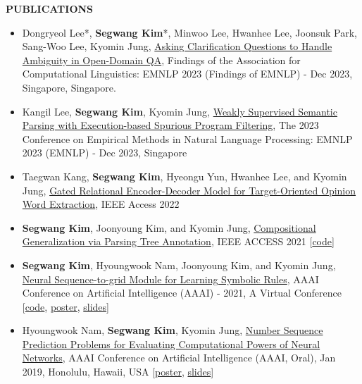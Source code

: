 \documentclass[12pt]{article}
\begin{document}
\vspace{0.2in} %


\begin{center}
	{\noindent \bfseries PUBLICATIONS}
    \noindent\makebox[\linewidth]{\rule{0.75\paperwidth}{0.4pt}}
\end{center}

\vspace{8pt} %
\begin{itemize}
\item Dongryeol Lee*, \textbf{Segwang Kim}*, Minwoo Lee, Hwanhee Lee, Joonsuk Park, Sang-Woo Lee, Kyomin Jung, \href{-}{Asking Clarification Questions to Handle Ambiguity in Open-Domain QA}, Findings of the Association for Computational Linguistics: EMNLP 2023 (Findings of EMNLP) - Dec 2023, Singapore, Singapore.
\item Kangil Lee, \textbf{Segwang Kim}, Kyomin Jung, \href{-}{Weakly Supervised Semantic Parsing with Execution-based Spurious Program Filtering}, The 2023 Conference on Empirical Methods in Natural Language Processing: EMNLP 2023 (EMNLP) - Dec 2023, Singapore
\item Taegwan Kang, \textbf{Segwang Kim}, Hyeongu Yun, Hwanhee Lee, and Kyomin Jung, \href{https://ieeexplore.ieee.org/document/9982601}{Gated Relational Encoder-Decoder Model for Target-Oriented Opinion Word Extraction}, IEEE Access 2022
\item \textbf{Segwang Kim}, Joonyoung Kim, and Kyomin Jung, \href{https://ieeexplore.ieee.org/document/9340248}{Compositional Generalization via Parsing Tree Annotation}, IEEE ACCESS 2021 [\href{https://github.com/SegwangKim/annotation-of-targets-using-parsing-trees}{code}]
\item \textbf{Segwang Kim}, Hyoungwook Nam, Joonyoung Kim, and Kyomin Jung, 
\href{https://ojs.aaai.org/index.php/AAAI/article/view/16994}{Neural Sequence-to-grid Module for Learning Symbolic Rules}, AAAI Conference on Artificial Intelligence (AAAI) - 2021, A Virtual Conference
[\href{https://github.com/SegwangKim/neural-seq2grid-module}{code}, \href{https://segwangkim.github.io/pdfs/poster_AAAI21.pdf}{poster}, \href{https://www.slideshare.net/segwangkim/seq2grid-aaai-2021}{slides}]
\item Hyoungwook Nam, \textbf{Segwang Kim}, Kyomin Jung, \href{https://ojs.aaai.org//index.php/AAAI/article/view/4387}{Number Sequence Prediction Problems for Evaluating Computational Powers of Neural Networks}, AAAI Conference on Artificial Intelligence (AAAI, Oral), Jan 2019, Honolulu, Hawaii, USA
[\href{https://segwangkim.github.io/pdfs/poster_AAAI19.pdf}{poster}, \href{https://segwangkim.github.io/pdfs/slides_AAAI19.pdf}{slides}]


\end{itemize}
\end{document}
